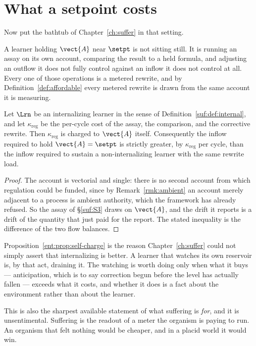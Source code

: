 \section{What a setpoint costs}

Now put the bathtub of Chapter~\ref{ch:suffer} in that setting.

A learner holding $\vect{A}$ near $\setpt$ is not sitting still.
It is running an assay on its own account, comparing the result to a held
formula, and adjusting an outflow it does not fully control against an
inflow it does not control at all.
Every one of those operations is a metered rewrite, and by
Definition~\ref{def:affordable} every metered rewrite is drawn from the
same account it is measuring.

\begin{proposition}
\label{ent:prop:self-charge}
Let $\Lrn$ be an internalizing learner in the sense of
Definition~\ref{suf:def:internal}, and let $\kappa_{\mathrm{reg}}$ be the
per-cycle cost of the assay, the comparison, and the corrective rewrite.
Then $\kappa_{\mathrm{reg}}$ is charged to $\vect{A}$ itself.
Consequently the inflow required to hold $\vect{A} = \setpt$ is strictly
greater, by $\kappa_{\mathrm{reg}}$ per cycle, than the inflow required to
sustain a non-internalizing learner with the same rewrite load.
\end{proposition}

\begin{proof}
The account is vectorial and single: there is no second account from
which regulation could be funded, since by Remark~\ref{rmk:ambient} an
account merely adjacent to a process is ambient authority, which the
framework has already refused.
So the assay of \S\ref{suf:S3} draws on $\vect{A}$, and the drift it
reports is a drift of the quantity that just paid for the report.
The stated inequality is the difference of the two flow balances.
\end{proof}

\begin{remark}
\label{ent:rmk:thermostat}
Proposition~\ref{ent:prop:self-charge} is the reason
Chapter~\ref{ch:suffer} could not simply assert that internalizing is
better.
A learner that watches its own reservoir is, by that act, draining it.
The watching is worth doing only when what it buys --- anticipation,
which is to say correction begun before the level has actually fallen ---
exceeds what it costs, and whether it does is a fact about the
environment rather than about the learner.

This is also the sharpest available statement of what suffering is
\emph{for}, and it is unsentimental.
Suffering is the readout of a meter the organism is paying to run.
An organism that felt nothing would be cheaper, and in a placid world it
would win.
\end{remark}


